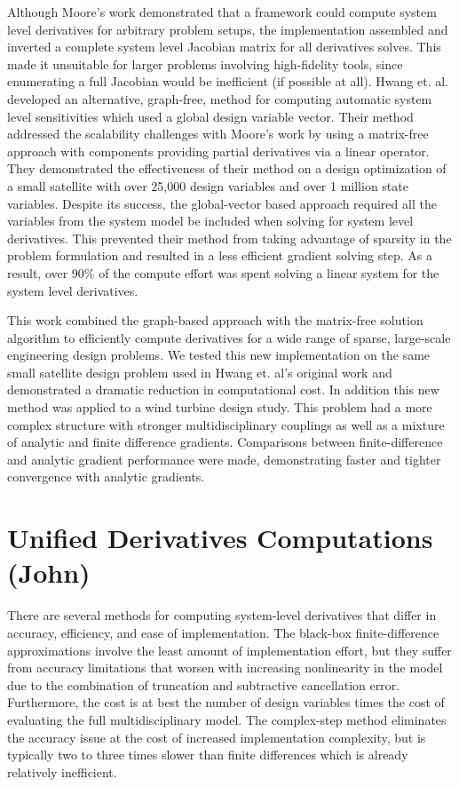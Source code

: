 \documentclass[]{aiaa-tc} %
\begin{document}
    Although Moore's work demonstrated that a framework could compute system level derivatives for arbitrary
    problem setups, the implementation assembled and inverted a complete system level Jacobian matrix for 
    all derivatives solves.  This made it unsuitable for larger problems involving 
    high-fidelity tools, since enumerating a full Jacobian would be inefficient (if possible at all).
    Hwang et. al. developed an alternative, graph-free, method for computing automatic system
    level sensitivities which used a global design variable vector\cite{CADRE2012}. Their method 
    addressed the scalability challenges with Moore's work by using a matrix-free approach with 
    components providing partial derivatives via a linear operator. They demonstrated the 
    effectiveness of their method on a design optimization of a small satellite
    with over 25,000 design variables and over 1 million state variables. Despite its success,
    the global-vector based approach required all the variables from the system model be
    included when solving for system level derivatives. This prevented their method
    from taking advantage of sparsity in the problem formulation and resulted in a less efficient gradient solving step.
    As a result, over 90\% of the compute effort was spent solving a linear system for the system
    level derivatives.

    This work combined the graph-based approach with the matrix-free solution algorithm
    to efficiently compute derivatives for a wide range of sparse, large-scale engineering
    design problems. We tested this new implementation on the same small satellite design problem used in 
    Hwang et. al's original work and demonstrated a dramatic reduction in computational cost. In addition
    this new method was applied to a wind turbine design study. This problem had a more 
    complex structure with stronger multidisciplinary couplings as well as a mixture of 
    analytic and finite difference gradients. Comparisons between finite-difference and analytic gradient 
    performance were made, demonstrating faster and tighter convergence with analytic gradients. 

  \section{Unified Derivatives Computations (John)}
  
	There are several methods for computing system-level derivatives that differ in accuracy, efficiency, and ease of implementation.
	The black-box finite-difference approximations involve the least amount of implementation effort, but they suffer from accuracy limitations that worsen with increasing nonlinearity in the model due to the combination of truncation and subtractive cancellation error.
	Furthermore, the cost is at best the number of design variables times the cost of evaluating the full multidisciplinary model.
	The complex-step method eliminates the accuracy issue at the cost of increased implementation complexity, but is typically two to three times slower than finite differences which is already relatively inefficient.
	
\end{document}
